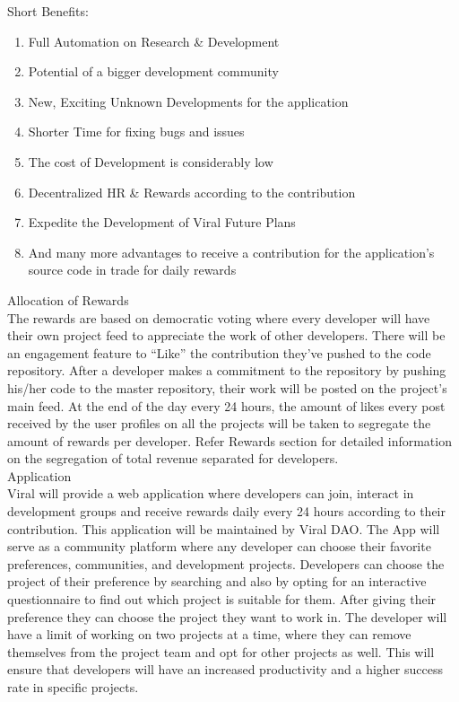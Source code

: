 \documentclass[10pt]{article}
\begin{document}
Short Benefits:
\begin{enumerate}[leftmargin=+0.2in]
\item Full Automation on Research \& Development
\item Potential of a bigger development community
\item New, Exciting Unknown Developments for the application
\item Shorter Time for fixing bugs and issues
\item The cost of Development is considerably low
\item Decentralized HR \& Rewards according to the contribution
\item Expedite the Development of Viral Future Plans
\item And many more advantages to receive a contribution for the application’s source code in trade for daily rewards
\end{enumerate}

Allocation of Rewards\\

The rewards are based on democratic voting where every developer will have their own project feed to appreciate the work of other developers. There will be an engagement feature to “Like” the contribution they’ve pushed to the code repository. After a developer makes a commitment to the repository by pushing his/her code to the master repository, their work will be posted on the project’s main feed. At the end of the day every 24 hours, the amount of likes every post received by the user profiles on all the projects will be taken to segregate the amount of rewards per developer. Refer Rewards section for detailed information on the segregation of total revenue separated for developers.\\

Application\\

Viral will provide a web application where developers can join, interact in development groups and receive rewards daily every 24 hours according to their contribution. This application will be maintained by Viral DAO. The App will serve as a community platform where any developer can choose their favorite preferences, communities, and development projects. Developers can choose the project of their preference by searching and also by opting for an interactive questionnaire to find out which project is suitable for them. After giving their preference they can choose the project they want to work in. The developer will have a limit of working on two projects at a time, where they can remove themselves from the project team and opt for other projects as well. This will ensure that developers will have an increased productivity and a higher success rate in specific projects.\\
\end{document}
